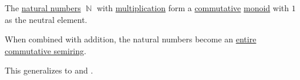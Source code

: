 \begin{proposition}\label{thm:natural_number_multiplication_properties}
  The \hyperref[def:natural_numbers]{natural numbers} \( \BbbN \) with \hyperref[def:peano_arithmetic/mult]{multiplication} form a \hyperref[def:binary_operation/commutative]{commutative} \hyperref[def:monoid]{monoid} with \( 1 \) as the neutral element.

  When combined with addition, the natural numbers become an \hyperref[def:entire_semiring]{entire} \hyperref[def:semiring/commutative]{commutative semiring}.
\end{proposition}
\begin{comments}
  \item This generalizes to  and .
\end{comments}
